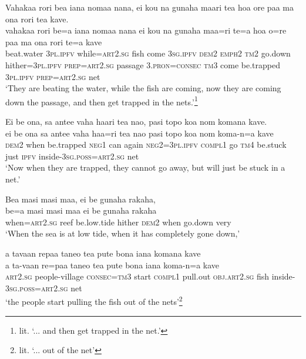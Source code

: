 \newpage
\ea\label{ex:text25-9}
Vahakaa rori bea iana nomaa nana, ei kou na gunaha maari tea hoa ore paa ma ona rori tea kave.\\
\gll vahakaa	rori	be=a	iana	nomaa	nana	ei	kou	na	gunaha	maa=ri	te=a	hoa	o=re	paa	ma	ona	rori	te=a	kave\\
     beat.water	3\textsc{pl}.\textsc{ipfv}	while=\textsc{art}2.\textsc{sg}	fish	come	3\textsc{sg}.\textsc{ipfv}	\textsc{dem}2	\textsc{emph}2	\textsc{tm}2	go.down	hither=3\textsc{pl}.\textsc{ipfv}	\textsc{prep}=\textsc{art}2.\textsc{sg}	passage	3.\textsc{pron}=\textsc{consec}	\textsc{tm}3	come	be.trapped	3\textsc{pl}.\textsc{ipfv}	\textsc{prep}=\textsc{art}2.\textsc{sg}	net\\
\glt `They are beating the water, while the fish are coming, now they are coming down the passage, and then get trapped in the nets.'\footnote{lit. `... and then get trapped in the net.'}
\z

\ea\label{ex:text25-10}
Ei be ona, sa antee vaha haari tea nao, pasi topo koa nom komana kave.\\
\gll ei	be	ona	sa	antee	vaha	haa=ri	tea	nao	pasi	topo	koa	nom	koma-n=a	kave\\
     \textsc{dem}2	when	be.trapped	\textsc{neg}1	can	again	\textsc{neg}2=3\textsc{pl}.\textsc{ipfv}	\textsc{compl}1	go	\textsc{tm}4	be.stuck	just	\textsc{ipfv}	inside-3\textsc{sg}.\textsc{poss}=\textsc{art}2.\textsc{sg}	net\\
\glt `Now when they are trapped, they cannot go away, but will just be stuck in a net.'
\z

\ea\label{ex:text25-11}
Bea masi masi maa, ei be gunaha rakaha,\\
\gll be=a	masi	masi	maa	ei	be	gunaha	rakaha\\
     when=\textsc{art}2.\textsc{sg}	reef	be.low.tide	hither	\textsc{dem}2	when	go.down	very\\
\glt `When the sea is at low tide, when it has completely gone down,'
\z

\ea\label{ex:text25-12}
a tavaan repaa taneo tea pute bona iana komana kave\\
\gll a	ta-vaan	re=paa	taneo	tea	pute	bona	iana	koma-n=a	kave\\
     \textsc{art}2.\textsc{sg}	people-village	\textsc{consec}=\textsc{tm}3	start	\textsc{compl}1	pull.out	\textsc{obj}.\textsc{art}2.\textsc{sg}	fish	inside-3\textsc{sg}.\textsc{poss}=\textsc{art}2.\textsc{sg}	net\\
\glt `the people start pulling the fish out of the nets'\footnote{lit. `... out of the net'}
\z

